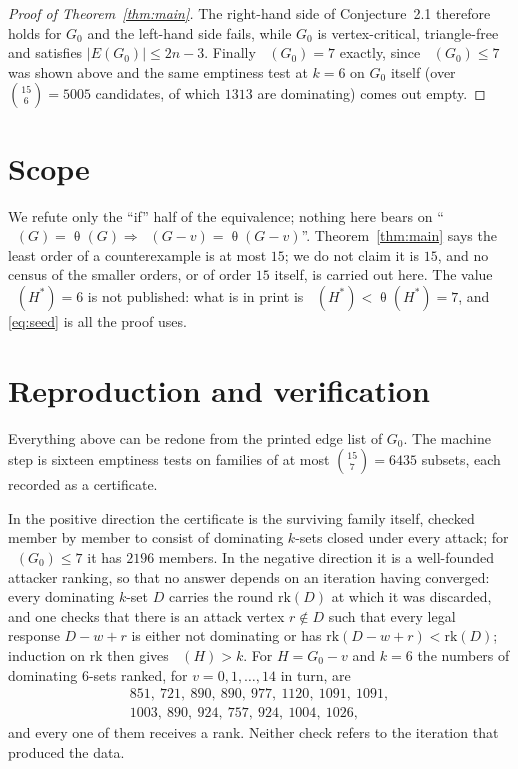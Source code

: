 \documentclass[11pt]{amsart}
\theoremstyle{remark}
\DeclareMathOperator{\edom}{\gamma^{\infty}}
\DeclareMathOperator{\thet}{\theta}
\newcommand{\Gz}{G_0}
\newcommand{\Hs}{H^{*}}
\begin{document}
\begin{proof}[Proof of Theorem~\ref{thm:main}]
The right-hand side of Conjecture~2.1 therefore holds for $\Gz$ and the left-hand side fails,
while $\Gz$ is vertex-critical, triangle-free and satisfies $|E(\Gz)|\le 2n-3$. Finally
$\edom(\Gz)=7$ exactly, since $\edom(\Gz)\le 7$ was shown above and the same emptiness test at
$k=6$ on $\Gz$ itself (over $\binom{15}{6}=5005$ candidates, of which $1313$ are dominating)
comes out empty.
\end{proof}

\section{Scope}

We refute only the ``if'' half of the equivalence; nothing here bears on
``$\edom(G)=\thet(G)\Rightarrow\edom(G-v)=\thet(G-v)$''. Theorem~\ref{thm:main} says the least
order of a counterexample is at most $15$; we do not claim it is $15$, and no census of the
smaller orders, or of order $15$ itself, is carried out here. The value $\edom(\Hs)=6$ is not
published: what is in print is $\edom(\Hs)<\thet(\Hs)=7$, and \eqref{eq:seed} is all the proof
uses.

\section{Reproduction and verification}

Everything above can be redone from the printed edge list of $\Gz$. The machine step is sixteen
emptiness tests on families of at most $\binom{15}{7}=6435$ subsets, each recorded as a
certificate.

In the positive direction the certificate is the surviving family itself, checked member by member
to consist of dominating $k$-sets closed under every attack; for $\edom(\Gz)\le 7$ it has $2196$
members. In the negative direction it is a well-founded attacker ranking, so that no answer depends
on an iteration having converged: every dominating $k$-set $D$ carries the round $\mathrm{rk}(D)$
at which it was discarded, and one checks that there is an attack vertex $r\notin D$ such that
every legal response $D-w+r$ is either not dominating or has $\mathrm{rk}(D-w+r)<\mathrm{rk}(D)$;
induction on $\mathrm{rk}$ then gives $\edom(H)>k$. For $H=\Gz-v$ and $k=6$ the numbers of
dominating $6$-sets ranked, for $v=0,1,\dots,14$ in turn, are
\begin{gather*}
  851,\ 721,\ 890,\ 890,\ 977,\ 1120,\ 1091,\ 1091,\\
  1003,\ 890,\ 924,\ 757,\ 924,\ 1004,\ 1026,
\end{gather*}
and every one of them receives a rank. Neither check refers to the iteration that produced the
data.
\end{document}
